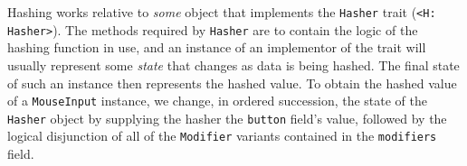 Hashing   works   relative  to   \textit{some}   object   that  implements   the
\texttt{Hasher}  trait (\texttt{<H: Hasher>}).  The  methods
required by  \texttt{Hasher} are to  contain the logic of  the hashing
function in  use, and an  instance of an implementor  of the trait  will usually
represent some  \textit{state} that changes as  data is being hashed.  The final
state of such an instance then represents the hashed value. To obtain the hashed
value  of  a  \texttt{MouseInput}  instance,  we  change,  in  ordered
succession, the state  of the \texttt{Hasher} object  by supplying the
hasher  the \texttt{button}  field's  value, followed  by the  logical
disjunction of all of the  \texttt{Modifier} variants contained in the
\texttt{modifiers} field.

